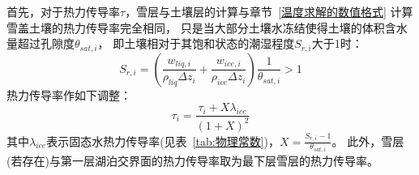 首先，对于热力传导率$\tau$，雪层与土壤层的计算与章节~\ref{温度求解的数值格式} 计算雪盖土壤的热力传导率完全相同，
只是当大部分土壤水冻结使得土壤的体积含水量超过孔隙度$\theta_{sat,i}$，
即土壤相对于其饱和状态的潮湿程度$S_{r,i}$大于1时：
\begin{equation}
S_{r,i}=\left(\frac{w_{liq, i}}{\rho_{liq} \Delta z_{i}}+\frac{w_{ice, i}}{\rho_{ice} \Delta z_{i}}\right) 
\frac{1}{\theta_{sat,i}}>1
\end{equation}
热力传导率作如下调整：
\begin{equation}
\tau_{i}=\frac{\tau_{i}+X \lambda_{ice}}{(1+X)^{2}}
\end{equation}
其中$\lambda_{ice}$表示固态水热力传导率(见表~\ref{tab:物理常数})，$X=\frac{S_{r,i}-1}{\theta_{sat,i}}$。
此外，雪层(若存在)与第一层湖泊交界面的热力传导率取为最下层雪层的热力传导率。

